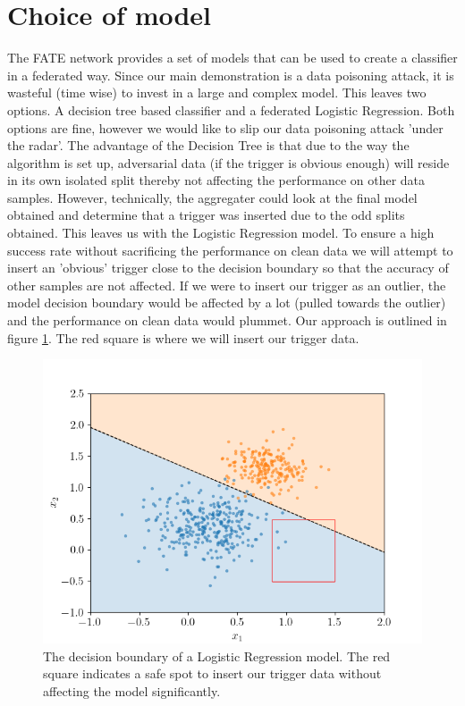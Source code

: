 \documentclass{article}
\begin{document}
\section{Choice of model}
The FATE network provides a set of models that can be used to create a classifier in a federated way. Since our main demonstration is a data poisoning attack, it is wasteful (time wise) to invest in a large and complex model. This leaves two options. A decision tree based classifier and a federated Logistic Regression. Both options are fine, however we would like to slip our data poisoning attack 'under the radar'. The advantage of the Decision Tree is that due to the way the algorithm is set up, adversarial data (if the trigger is obvious enough) will reside in its own isolated split thereby not affecting the performance on other data samples. However, technically, the aggregater could look at the final model obtained and determine that a trigger was inserted due to the odd splits obtained. This leaves us with the Logistic Regression model. To ensure a high success rate without sacrificing the performance on clean data we will attempt to insert an 'obvious' trigger close to the decision boundary so that the accuracy of other samples are not affected. If we were to insert our trigger as an outlier, the model decision boundary would be affected by a lot (pulled towards the outlier) and the performance on clean data would plummet. Our approach is outlined in figure \ref{fig:mesh1}. The red square is where we will insert our trigger data.

\begin{figure}[h]
    \centering
    \includegraphics[scale=0.4]{assets/decision-boundary.png}
    \caption{The decision boundary of a Logistic Regression model. The red square indicates a safe spot to insert our trigger data without affecting the model significantly.}
    \label{fig:mesh1}
\end{figure}
\end{document}
